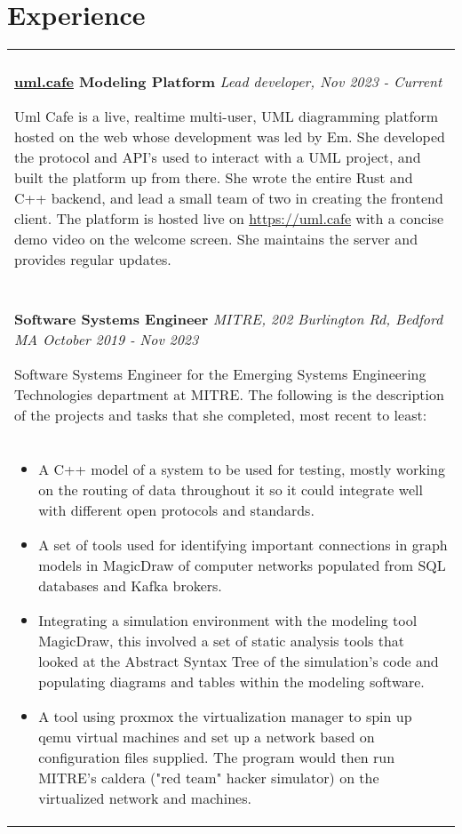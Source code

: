 \documentclass[11pt]{article}
\begin{document}
\section*{Experience}
\begin{tabular}{p{18.5cm}}
    \hline
    \multicolumn{1}{c}{} \\

     \large \textbf{\href{https://uml.cafe}{uml.cafe} Modeling Platform} \normalsize \textit{Lead developer, \hfill Nov 2023 - Current}

     \> Uml Cafe is a live, realtime multi-user, UML diagramming platform hosted on the web whose development was led 
     by Em. She developed the protocol and API's used to interact with a UML project, and built the platform up from there. She wrote the
     entire Rust and C++ backend, and lead a small team of two in creating the frontend client. The platform is hosted live on 
     \url{https://uml.cafe} with a concise demo video on the welcome screen. She maintains the server and provides regular updates.\\
 
     \multicolumn{1}{c}{} \\

    \large \textbf{Software Systems Engineer} \normalsize \textit{MITRE, 202 Burlington Rd, Bedford MA \hfill October 2019 - Nov 2023}

    \> Software Systems Engineer for the Emerging Systems Engineering Technologies department at MITRE. The following is the 
    description of the projects and tasks that she completed, most recent to least:\\ 

    \begin{itemize}[noitemsep,topsep=0pt]
      \item A C++ model of a system to be used for testing, mostly working on the routing of data throughout it so it could 
      integrate well with different open protocols and standards.
      \item A set of tools used for identifying important connections in graph models in MagicDraw of computer networks populated from SQL 
      databases and Kafka brokers.
      \item Integrating a simulation environment with the modeling tool MagicDraw, this involved 
      a set of static analysis tools that looked at the Abstract Syntax Tree of the simulation's code and populating diagrams and 
      tables within the modeling software.
      \item A tool using proxmox the virtualization manager to spin up qemu virtual machines and 
      set up a network based on configuration files supplied. The program would then run MITRE's caldera ("red team" hacker simulator) on 
      the virtualized network and machines.
    \end{itemize}\\


\end{tabular}
\end{document}
